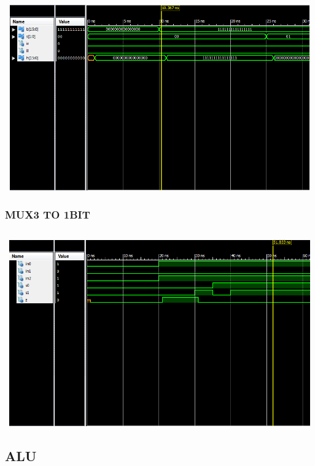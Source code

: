 \documentclass{article}
\begin{document}
\begin{lstlisting}

\end{lstlisting}
\includegraphics[width=16cm, height=8cm]{test_shifter.png}
\pagebreak


\subsubsection{MUX3 TO 1BIT}\label{sec:result}

\begin{lstlisting}

\end{lstlisting}
\includegraphics[width=16cm, height=8cm]{test_mux1.png}
\pagebreak




\subsection{ALU}\label{sec:result}
\end{document}
